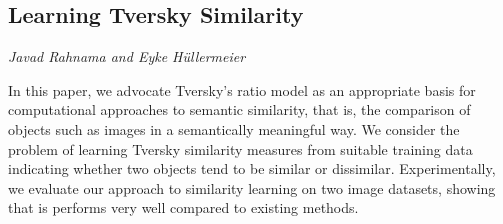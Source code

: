 \documentclass[../booklet.tex]{subfiles}
\begin{document}
\subsection[Learning Tversky Similarity. {\it Javad Rahnama and Eyke Hüllermeier}]{Learning Tversky Similarity}
 

\begin{center}
  {\it Javad Rahnama and Eyke Hüllermeier}
\end{center}



In this paper, we advocate Tversky's ratio model as an appropriate basis for computational approaches to semantic similarity, that is, the comparison of objects such as images in a semantically meaningful way. We consider the problem of learning Tversky similarity measures from suitable training data indicating whether two objects tend to be similar or dissimilar. Experimentally, we evaluate our approach to similarity learning on two image datasets, showing that is performs very well compared to existing methods.

\end{document}
